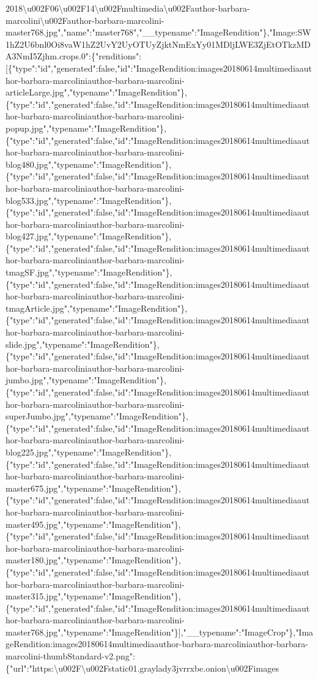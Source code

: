 2018\textbackslash{}u002F06\textbackslash{}u002F14\textbackslash{}u002Fmultimedia\textbackslash{}u002Fauthor-barbara-marcolini\textbackslash{}u002Fauthor-barbara-marcolini-master768.jpg","name":"master768","\_\_typename":"ImageRendition"\},"Image:SW1hZ2U6bnl0Oi8vaW1hZ2UvY2UyOTUyZjktNmExYy01MDljLWE3ZjEtOTkzMDA3NmI5Zjhm.crops.0":\{"renditions":{[}\{"type":"id","generated":false,"id":"ImageRendition:images20180614multimediaauthor-barbara-marcoliniauthor-barbara-marcolini-articleLarge.jpg","typename":"ImageRendition"\},\{"type":"id","generated":false,"id":"ImageRendition:images20180614multimediaauthor-barbara-marcoliniauthor-barbara-marcolini-popup.jpg","typename":"ImageRendition"\},\{"type":"id","generated":false,"id":"ImageRendition:images20180614multimediaauthor-barbara-marcoliniauthor-barbara-marcolini-blog480.jpg","typename":"ImageRendition"\},\{"type":"id","generated":false,"id":"ImageRendition:images20180614multimediaauthor-barbara-marcoliniauthor-barbara-marcolini-blog533.jpg","typename":"ImageRendition"\},\{"type":"id","generated":false,"id":"ImageRendition:images20180614multimediaauthor-barbara-marcoliniauthor-barbara-marcolini-blog427.jpg","typename":"ImageRendition"\},\{"type":"id","generated":false,"id":"ImageRendition:images20180614multimediaauthor-barbara-marcoliniauthor-barbara-marcolini-tmagSF.jpg","typename":"ImageRendition"\},\{"type":"id","generated":false,"id":"ImageRendition:images20180614multimediaauthor-barbara-marcoliniauthor-barbara-marcolini-tmagArticle.jpg","typename":"ImageRendition"\},\{"type":"id","generated":false,"id":"ImageRendition:images20180614multimediaauthor-barbara-marcoliniauthor-barbara-marcolini-slide.jpg","typename":"ImageRendition"\},\{"type":"id","generated":false,"id":"ImageRendition:images20180614multimediaauthor-barbara-marcoliniauthor-barbara-marcolini-jumbo.jpg","typename":"ImageRendition"\},\{"type":"id","generated":false,"id":"ImageRendition:images20180614multimediaauthor-barbara-marcoliniauthor-barbara-marcolini-superJumbo.jpg","typename":"ImageRendition"\},\{"type":"id","generated":false,"id":"ImageRendition:images20180614multimediaauthor-barbara-marcoliniauthor-barbara-marcolini-blog225.jpg","typename":"ImageRendition"\},\{"type":"id","generated":false,"id":"ImageRendition:images20180614multimediaauthor-barbara-marcoliniauthor-barbara-marcolini-master675.jpg","typename":"ImageRendition"\},\{"type":"id","generated":false,"id":"ImageRendition:images20180614multimediaauthor-barbara-marcoliniauthor-barbara-marcolini-master495.jpg","typename":"ImageRendition"\},\{"type":"id","generated":false,"id":"ImageRendition:images20180614multimediaauthor-barbara-marcoliniauthor-barbara-marcolini-master180.jpg","typename":"ImageRendition"\},\{"type":"id","generated":false,"id":"ImageRendition:images20180614multimediaauthor-barbara-marcoliniauthor-barbara-marcolini-master315.jpg","typename":"ImageRendition"\},\{"type":"id","generated":false,"id":"ImageRendition:images20180614multimediaauthor-barbara-marcoliniauthor-barbara-marcolini-master768.jpg","typename":"ImageRendition"\}{]},"\_\_typename":"ImageCrop"\},"ImageRendition:images20180614multimediaauthor-barbara-marcoliniauthor-barbara-marcolini-thumbStandard-v2.png":\{"url":"https:\textbackslash{}u002F\textbackslash{}u002Fstatic01.graylady3jvrrxbe.onion\textbackslash{}u002Fimages\textbacksla